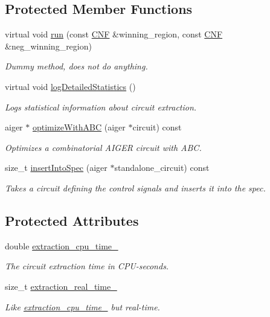 \subsection*{Protected Member Functions}
\begin{DoxyCompactItemize}
\item 
virtual void \hyperlink{classStoreImplExtractor_a69c775e70973cbd4b6a69775f25367cd}{run} (const \hyperlink{classCNF}{C\-N\-F} \&winning\-\_\-region, const \hyperlink{classCNF}{C\-N\-F} \&neg\-\_\-winning\-\_\-region)
\begin{DoxyCompactList}\small\item\em Dummy method, does not do anything. \end{DoxyCompactList}\item 
virtual void \hyperlink{classCNFImplExtractor_abe790c767f6c71a52ef8b0a61ab39eaa}{log\-Detailed\-Statistics} ()
\begin{DoxyCompactList}\small\item\em Logs statistical information about circuit extraction. \end{DoxyCompactList}\item 
aiger $\ast$ \hyperlink{classCNFImplExtractor_a58a4e5021d0ef9c4190a5be74fb5a83e}{optimize\-With\-A\-B\-C} (aiger $\ast$circuit) const 
\begin{DoxyCompactList}\small\item\em Optimizes a combinatorial A\-I\-G\-E\-R circuit with A\-B\-C. \end{DoxyCompactList}\item 
size\-\_\-t \hyperlink{classCNFImplExtractor_a0970602635f3356712d57ebb28d12c0d}{insert\-Into\-Spec} (aiger $\ast$standalone\-\_\-circuit) const 
\begin{DoxyCompactList}\small\item\em Takes a circuit defining the control signals and inserts it into the spec. \end{DoxyCompactList}\end{DoxyCompactItemize}
\subsection*{Protected Attributes}
\begin{DoxyCompactItemize}
\item 
double \hyperlink{classCNFImplExtractor_ab8be06d42fd3c4b569ec22cfcf2f508e}{extraction\-\_\-cpu\-\_\-time\-\_\-}
\begin{DoxyCompactList}\small\item\em The circuit extraction time in C\-P\-U-\/seconds. \end{DoxyCompactList}\item 
size\-\_\-t \hyperlink{classCNFImplExtractor_ae06413cf08f868357d64545b3041aa18}{extraction\-\_\-real\-\_\-time\-\_\-}
\begin{DoxyCompactList}\small\item\em Like \hyperlink{classCNFImplExtractor_ab8be06d42fd3c4b569ec22cfcf2f508e}{extraction\-\_\-cpu\-\_\-time\-\_\-} but real-\/time. \end{DoxyCompactList}\end{DoxyCompactItemize}
